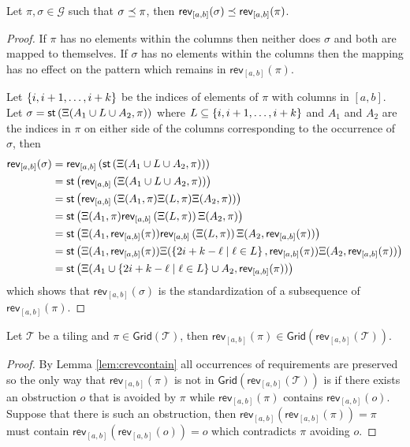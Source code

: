 \begin{lemma}\label{lem:crevcontain}
Let $\pi, \sigma \in \mathcal{G}$ such that $\sigma \preceq \pi$, then $\textsf{rev}_{[a,b]}(\sigma) \preceq \textsf{rev}_{[a,b]}(\pi)$.
\end{lemma}
\begin{proof}
If $\pi$ has no elements within the columns then neither does $\sigma$ and both are mapped to themselves. If $\sigma$ has no elements within the columns then the mapping has no effect on the pattern which remains in $\textsf{rev}_{[a,b]}(\pi)$. 

Let $\left\{i,i+1,\dotsc,i+k\right\}$ be the indices of elements of $\pi$ with columns in $[a,b]$. Let $\sigma = \textsf{st}\left(\Xi(A_1\cup L \cup A_2,\pi)\right)$ where $L \subseteq \left\{i,i+1,\dotsc,i+k\right\}$ and $A_1$ and $A_2$ are the indices in $\pi$ on either side of the columns corresponding to the occurrence of $\sigma$, then
\begin{align*}
    \textsf{rev}_{[a,b]}(\sigma) &= \textsf{rev}_{[a,b]}\left(\textsf{st}\left(\Xi(A_1\cup L \cup A_2,\pi)\right)\right)\\ 
    &= \textsf{st}\left(\textsf{rev}_{[a,b]}\left(\Xi(A_1\cup L \cup A_2,\pi)\right)\right)\\
    &= \textsf{st}\left(\textsf{rev}_{[a,b]}\left(\Xi(A_1,\pi)\Xi(L,\pi)\Xi(A_2,\pi)\right)\right)\\
    &= \textsf{st}\left(\Xi(A_1,\pi)\textsf{rev}_{[a,b]}\left(\Xi(L,\pi)\right)\Xi(A_2,\pi)\right) \\
    &= \textsf{st}\left(\Xi(A_1,\textsf{rev}_{[a,b]}(\pi))\textsf{rev}_{[a,b]}\left(\Xi(L,\pi)\right)\Xi(A_2,\textsf{rev}_{[a,b]}(\pi))\right) \\
    &= \textsf{st}\left(\Xi(A_1,\textsf{rev}_{[a,b]}(\pi))\Xi(\left\{2i+k-\ell \mid \ell \in L\right\},\textsf{rev}_{[a,b]}(\pi))\Xi(A_2,\textsf{rev}_{[a,b]}(\pi))\right)\\
    &= \textsf{st}\left(\Xi(A_1 \cup \left\{2i+k-\ell \mid \ell \in L\right\} \cup A_2,\textsf{rev}_{[a,b]}(\pi))\right)
\end{align*}
which shows that $\textsf{rev}_{[a,b]}(\sigma)$ is the standardization of a subsequence of $\textsf{rev}_{[a,b]}(\pi)$.
\end{proof}

\begin{lemma}\label{lem:crevgrid}
Let $\mathcal{T}$ be a tiling and $\pi \in \textsf{Grid}(\mathcal{T})$, then $\textsf{rev}_{[a,b]}(\pi)\in\textsf{Grid}(\textsf{rev}_{[a,b]}(\mathcal{T}))$.
\end{lemma}
\begin{proof}
By Lemma \ref{lem:crevcontain} all occurrences of requirements are preserved so the only way that $\textsf{rev}_{[a,b]}(\pi)$ is not in $\textsf{Grid}(\textsf{rev}_{[a,b]}(\mathcal{T}))$ is if there exists an obstruction $o$ that is avoided by $\pi$ while $\textsf{rev}_{[a,b]}(\pi)$ contains $\textsf{rev}_{[a,b]}(o)$. Suppose that there is such an obstruction, then $\textsf{rev}_{[a,b]}(\textsf{rev}_{[a,b]}(\pi)) = \pi$ must contain $\textsf{rev}_{[a,b]}(\textsf{rev}_{[a,b]}(o)) = o$ which contradicts $\pi$ avoiding $o$.
\end{proof}

